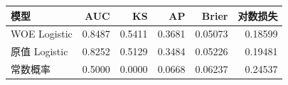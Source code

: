 \begin{tabular}{lrrrrr}
\toprule
模型 & AUC & KS & AP & Brier & 对数损失 \\
\midrule
WOE Logistic & 0.8487 & 0.5411 & 0.3681 & 0.05073 & 0.18599 \\
原值 Logistic & 0.8252 & 0.5129 & 0.3484 & 0.05226 & 0.19481 \\
常数概率 & 0.5000 & 0.0000 & 0.0668 & 0.06237 & 0.24537 \\
\bottomrule
\end{tabular}
